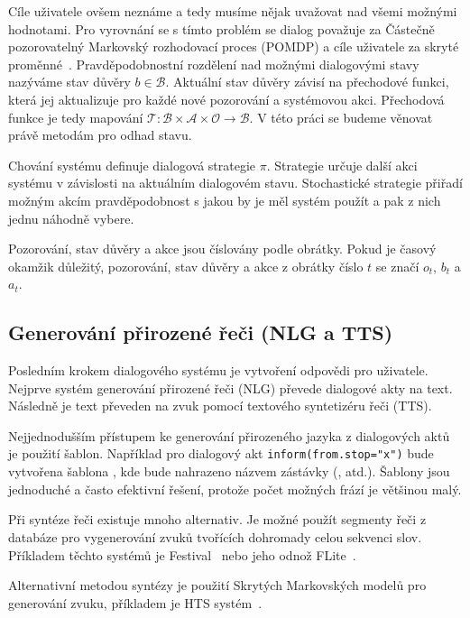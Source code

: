 Cíle uživatele ovšem neznáme a tedy musíme nějak uvažovat nad všemi možnými hodnotami.
Pro vyrovnání se s tímto problém se dialog považuje za Částečně pozorovatelný Markovský rozhodovací proces (POMDP) a cíle uživatele za skryté proměnné~\cite{williams2007partially}.
Pravděpodobnostní rozdělení nad možnými dialogovými stavy nazýváme stav důvěry $b \in \mathcal{B}$.
Aktuální stav důvěry závisí na přechodové funkci, která jej aktualizuje pro každé nové pozorování a systémovou akci.
Přechodová funkce je tedy mapování $\mathcal{T} : \mathcal{B} \times \mathcal{A} \times \mathcal{O} \longrightarrow \mathcal{B}$.
V této práci se budeme věnovat právě metodám pro odhad stavu.

Chování systému definuje dialogová strategie $\pi$.
Strategie určuje další akci systému v závislosti na aktuálním dialogovém stavu.
Stochastické strategie přiřadí možným akcím pravděpodobnost s jakou by je měl systém použít a pak z nich jednu náhodně vybere.

Pozorování, stav důvěry a akce jsou číslovány podle obrátky.
Pokud je časový okamžik důležitý, pozorování, stav důvěry a akce z obrátky číslo $t$ se značí $o_t$, $b_t$ a $a_t$.

\subsection{Generování přirozené řeči (NLG a TTS)}

Posledním krokem dialogového systému je vytvoření odpovědi pro uživatele.
Nejprve systém generování přirozené řeči (NLG) převede dialogové akty na text.
Následně je text převeden na zvuk pomocí textového syntetizéru řeči (TTS).

Nejjednodušším přístupem ke generování přirozeného jazyka z dialogových aktů je použití šablon.
Například pro dialogový akt {\tt inform(from.stop="x")} bude vytvořena šablona , kde  bude nahrazeno názvem zástávky (,  atd.).
Šablony jsou jednoduché a často efektivní řešení, protože počet možných frází je většinou malý.

Při syntéze řeči existuje mnoho alternativ.
Je možné použít segmenty řeči z databáze pro vygenerování zvuků tvořících dohromady celou sekvenci slov.
Příkladem těchto systémů je Festival~\cite{black2001festival} nebo jeho odnož  FLite~\cite{black2001flite}.

Alternativní metodou syntézy je použití Skrytých Markovských modelů pro generování zvuku, příkladem je HTS systém~\cite{zen2007hmm}.

